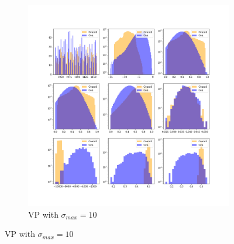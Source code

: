 \begin{figure}[htbp]
\begin{subfigure}[b]{0.4\textwidth}
        \includegraphics[width=\textwidth]{Figures/vp_10.png}
        \caption{VP with $\sigma_{max} = 10$}
        \label{fig:vp_10}
    \end{subfigure}
    
    \vspace{0.4em} %
    

\end{figure}
